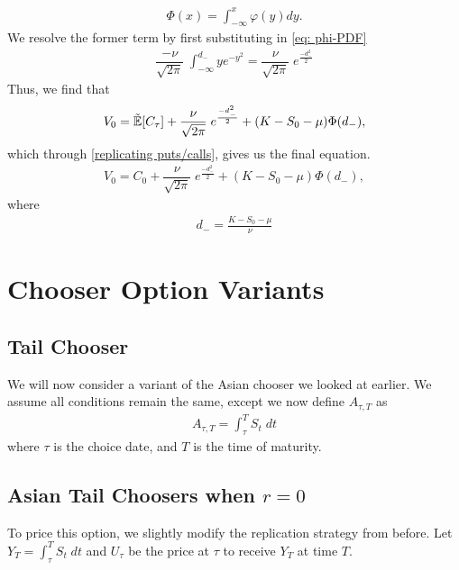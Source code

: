\documentclass[reqno]{amsart}
\begin{document}
\begin{align} \label{eq: cdfnormal}
     \Phi(x) = \int_{-\infty}^x \varphi(y) dy.
\end{align}
We resolve the former term by first substituting in \eqref{eq: phi-PDF}
\begin{align}
     \dfrac{-\nu}{\sqrt{2\pi}} \;\int_{-\infty}^{d_{-}} ye^{-y^2} = \dfrac{\nu}{\sqrt{2\pi}} \;e^{\frac{-d_-^2}{2}}
\end{align}
Thus, we find that
\begin{align}
     V_0 = \tilde{\mathbb{E}}[C_\tau] + \dfrac{\nu}{\sqrt{2\pi}} \;e^{\frac{-d_-^2}{2}} +  (K- S_0 - \mu) \Phi(d_-),
\end{align}
which through \eqref{replicating puts/calls}, gives us the final equation.
\begin{align}
     V_0 = C_0 + \dfrac{\nu}{\sqrt{2\pi}} \;e^{\frac{-d_-^2}{2}} +  (K- S_0 - \mu) \Phi(d_-),
\end{align}
where
\begin{align}
      d_- =  \frac{K-S_0-\mu}{\nu}
\end{align}

\section{Chooser Option Variants}

\subsection{Tail Chooser}
We will now consider a variant of the Asian chooser we looked at earlier. We assume all conditions remain the same, except we now define $A_{\tau, T}$ as
\begin{align}
     A_{\tau, T} = \int_\tau^T S_t \;dt
\end{align}
where $\tau$ is the choice date, and $T$ is the time of maturity.

\subsection{Asian Tail Choosers when $r = 0$}
To price this option, we slightly modify the replication strategy from before. Let $Y_T = \int_\tau^T S_t \;dt$ and $U_\tau$ be the price at $\tau$ to receive $Y_T$ at time $T$.
\end{document}
